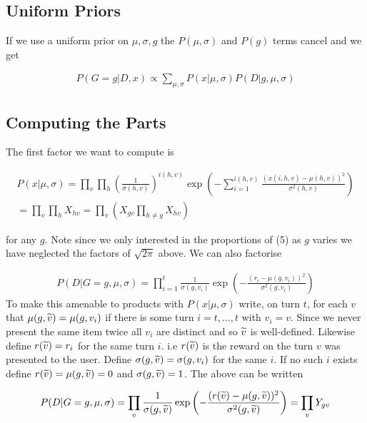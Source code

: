 \documentclass[12pt]{article}
\theoremstyle{definition}
\newcommand{\si}{\ensuremath{\sigma}}
\newcommand{\0}{\ensuremath{\varnothing}}
\newcommand{\wt}{\ensuremath{\widetilde}}
\newcommand{\1}{{\bf 1}}
\begin{document}
  \subsection{Uniform Priors}
   
   If we use a uniform prior on $\mu, \si,g$ the $P(\mu, \si)$ and $P(g)$  terms cancel and we get 
   
  \begin{align}
   P(G=g| D, x) \propto \sum_{\mu,\si} P( x|        \mu,    \si  ) P(D |  g,       \mu,    \si  )    
  \end{align}
  
  \subsection{Computing the Parts}
   
   The first factor   we want to compute is
   
  \begin{align*}
   P(x|         \mu,  \si  )  = \prod_v \prod_{h}  \left(  \frac{ 1 }{\si(h,v)  } \right)^{i(h,v)}\exp \left( -\sum_{i=1}^{i(h,v)} \frac{(x(i,h,v) - \mu(h,v))^2}{\si^2(h,v)}\right)  \\
   =    \prod_v \prod_{h}  X_{hv} =  \prod_v \left( X_{g v}\prod_{h \ne g}  X_{hv} \right)
  \end{align*}
  
  for any $g$. Note  since we only interested in the proportions   of (5) as $g$ varies we have neglected the factors of $\sqrt {2 \pi}$ above. We can  also factorise 
  
  
  \begin{align*}P(D| G=g,       \mu,    \si  )  = \prod_{i=1}^t \frac{  1}{\si(g,v_i) } \exp \left(- \frac{(r_i -   \mu(g,v_i))^2}{  \si^2(g,v_i)}\right)
  \end{align*}    
  To make this amenable  to products with $P(x|\mu, \sigma)$ write, on turn $t$, for each $v$ that 
  $\mu(g,\wt v) = \mu(g,v_i)$ if there is some turn $i=t,\ldots, t$ with $v_i = v$. Since we never present the same item twice all $v_i$ are distinct and so $\wt v$ is well-defined. Likewise define $r(\wt v) = r_i$ for the same turn $i$. i.e $r (\wt v)$ is the reward on the turn $v$ was presented to the user.  Define $\si(g,\wt v) = \si(g, v_i)$ for the same $i$. If no such $i$ exists define $r(\wt v) = \mu(g, \wt v) = 0$ and $\si(g,\wt v) = 1$. The above can be written
  
  \begin{align*}P(D| G=g,       \mu,    \si  )  = \prod_{v} \frac{  1}{\si(g,\wt v) } \exp \left(- \frac{(r(\wt v) -   \mu(g,\wt v))^2}{  \si^2(g,\wt v)}\right) = \prod_v Y_{gv}
  \end{align*}    
  
\end{document}
